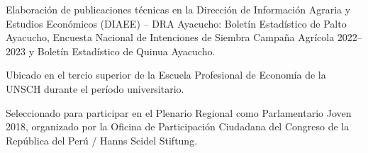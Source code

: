 

\begin{scholarship}
	
	
	
	{Elaboración de publicaciones técnicas en la Dirección de Información Agraria
		y Estudios Económicos (DIAEE) -- DRA Ayacucho: Boletín Estadístico de Palto
		Ayacucho, Encuesta Nacional de Intenciones de Siembra Campaña Agrícola
		2022--2023 y Boletín Estadístico de Quinua Ayacucho.}
	
	{Ubicado en el tercio superior de la Escuela Profesional de Economía
		de la UNSCH durante el período universitario.}
	
	{Seleccionado para participar en el Plenario Regional como Parlamentario Joven
		2018, organizado por la Oficina de Participación Ciudadana del Congreso de
		la República del Perú / Hanns Seidel Stiftung.}
	

\end{scholarship}
